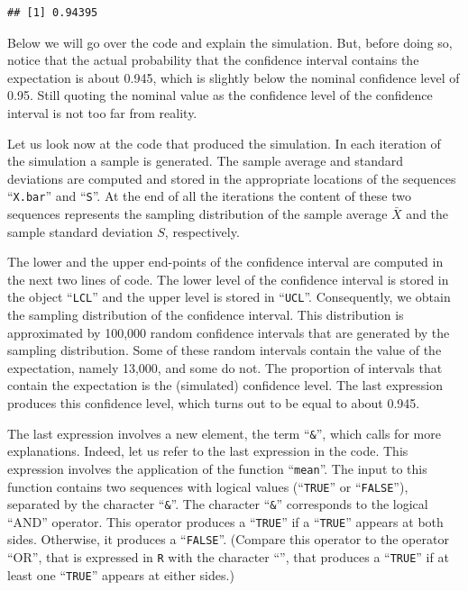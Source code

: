 \documentclass[]{krantz}
\theoremstyle{definition}
\theoremstyle{definition}
\theoremstyle{definition}
\theoremstyle{remark}
\begin{document}
\begin{verbatim}
## [1] 0.94395
\end{verbatim}

Below we will go over the code and explain the simulation. But, before
doing so, notice that the actual probability that the confidence
interval contains the expectation is about 0.945, which is slightly
below the nominal confidence level of 0.95. Still quoting the nominal
value as the confidence level of the confidence interval is not too far
from reality.

Let us look now at the code that produced the simulation. In each
iteration of the simulation a sample is generated. The sample average
and standard deviations are computed and stored in the appropriate
locations of the sequences ``\texttt{X.bar}'' and ``\texttt{S}''. At the
end of all the iterations the content of these two sequences represents
the sampling distribution of the sample average \(\bar X\) and the
sample standard deviation \(S\), respectively.

The lower and the upper end-points of the confidence interval are
computed in the next two lines of code. The lower level of the
confidence interval is stored in the object ``\texttt{LCL}'' and the
upper level is stored in ``\texttt{UCL}''. Consequently, we obtain the
sampling distribution of the confidence interval. This distribution is
approximated by 100,000 random confidence intervals that are generated
by the sampling distribution. Some of these random intervals contain the
value of the expectation, namely 13,000, and some do not. The proportion
of intervals that contain the expectation is the (simulated) confidence
level. The last expression produces this confidence level, which turns
out to be equal to about 0.945.

The last expression involves a new element, the term ``\texttt{\&}'',
which calls for more explanations. Indeed, let us refer to the last
expression in the code. This expression involves the application of the
function ``\texttt{mean}''. The input to this function contains two
sequences with logical values (``\texttt{TRUE}'' or ``\texttt{FALSE}''),
separated by the character ``\texttt{\&}''. The character
``\texttt{\&}'' corresponds to the logical ``AND'' operator. This
operator produces a ``\texttt{TRUE}'' if a ``\texttt{TRUE}'' appears at
both sides. Otherwise, it produces a ``\texttt{FALSE}''. (Compare this
operator to the operator ``OR'', that is expressed in \texttt{R} with
the character ``\texttt{\textbar{}}'', that produces a ``\texttt{TRUE}''
if at least one ``\texttt{TRUE}'' appears at either sides.)
\end{document}
